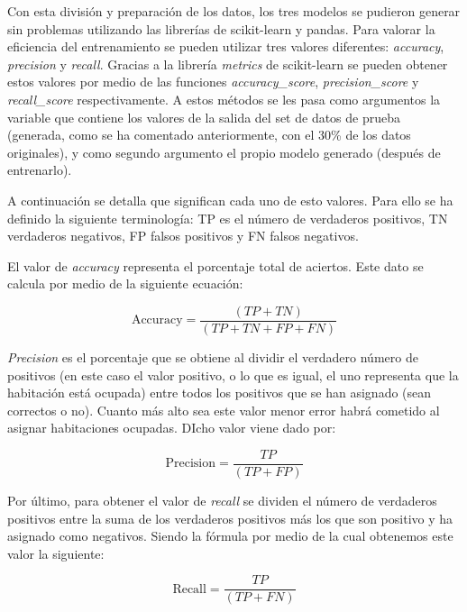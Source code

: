 \documentclass[a4paper, 12pt]{book}
\begin{document}
Con esta división y preparación de los datos, los tres modelos se pudieron generar sin problemas utilizando las librerías de scikit-learn y pandas. Para valorar la eficiencia del entrenamiento se pueden utilizar tres valores diferentes: \textit{accuracy}, \textit{precision} y \textit{recall}. Gracias a la librería \textit{metrics} de scikit-learn se pueden obtener estos valores por medio de las funciones \textit{accuracy\_score}, \textit{precision\_score} y \textit{recall\_score} respectivamente. A estos métodos se les pasa como argumentos la variable que contiene los valores de la salida del set de datos de prueba (generada, como se ha comentado anteriormente, con el 30\% de los datos originales), y como segundo argumento el propio modelo generado (después de entrenarlo). 

A continuación se detalla que significan cada uno de esto valores. Para ello se ha definido la siguiente terminología: TP es el número de verdaderos positivos, TN verdaderos negativos, FP falsos positivos y FN falsos negativos.

El valor de \textit{accuracy} representa el porcentaje total de aciertos. Este dato se calcula por medio de la siguiente ecuación:

\begin{equation}
 \boxed{\mbox{Accuracy} = \frac{(TP + TN)}{(TP + TN + FP + FN)}}
\end{equation}

\textit{Precision} es el porcentaje que se obtiene al dividir el verdadero número de positivos (en este caso el valor positivo, o lo que es igual, el uno representa que la habitación está ocupada) entre todos los positivos que se han asignado (sean correctos o no). Cuanto más alto sea este valor menor error habrá cometido al asignar habitaciones ocupadas. DIcho valor viene dado por:

\begin{equation}
\label{eqn:accuracy} 
 \boxed{\mbox{Precision} = \frac{TP}{(TP + FP)}}
\end{equation}

Por último, para obtener el valor de \textit{recall} se dividen el número de verdaderos positivos entre la suma de los verdaderos positivos más los que son positivo y ha asignado como negativos. Siendo la fórmula por medio de la cual obtenemos este valor la siguiente:

\begin{equation}
 \boxed{\mbox{Recall} = \frac{TP}{(TP + FN)}}
\end{equation}
\end{document}
